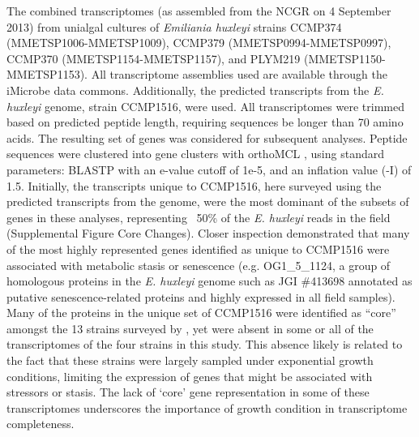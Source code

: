 The combined transcriptomes (as assembled from the NCGR on 4 September 2013) from unialgal cultures of \textit{Emiliania huxleyi} strains CCMP374 (MMETSP1006-MMETSP1009), CCMP379 (MMETSP0994-MMETSP0997), CCMP370 (MMETSP1154-MMETSP1157), and PLYM219 (MMETSP1150-MMETSP1153). All transcriptome assemblies used are available through the iMicrobe data commons. Additionally, the predicted transcripts from the \textit{E. huxleyi} genome, strain CCMP1516, were used. All transcriptomes were trimmed based on predicted peptide length, requiring sequences be longer than 70 amino acids. The resulting set of genes was considered for subsequent analyses. Peptide sequences were clustered into gene clusters with orthoMCL \citep{Li2003}, using standard parameters: BLASTP with an e-value cutoff of 1e-5, and an inflation value (-I) of 1.5. Initially, the transcripts unique to CCMP1516, here surveyed using the predicted transcripts from the genome, were the most dominant of the subsets of genes in these analyses, representing ~50\% of the \textit{E. huxleyi} reads in the field (Supplemental Figure Core Changes). Closer inspection demonstrated that many of the most highly represented genes identified as unique to CCMP1516 were associated with metabolic stasis or senescence (e.g. OG1\_5\_1124, a group of homologous proteins in the \textit{E. huxleyi} genome such as JGI \#413698 annotated as putative senescence-related proteins and highly expressed in all field samples). Many of the proteins in the unique set of CCMP1516 were identified as ``core'' amongst the 13 strains surveyed by \citet{Read2013}, yet were absent in some or all of the transcriptomes of the four strains in this study. This absence likely is related to the fact that these strains were largely sampled under exponential growth conditions, limiting the expression of genes that might be associated with stressors or stasis. The lack of `core' gene representation in some of these transcriptomes underscores the importance of growth condition in transcriptome completeness.\par

